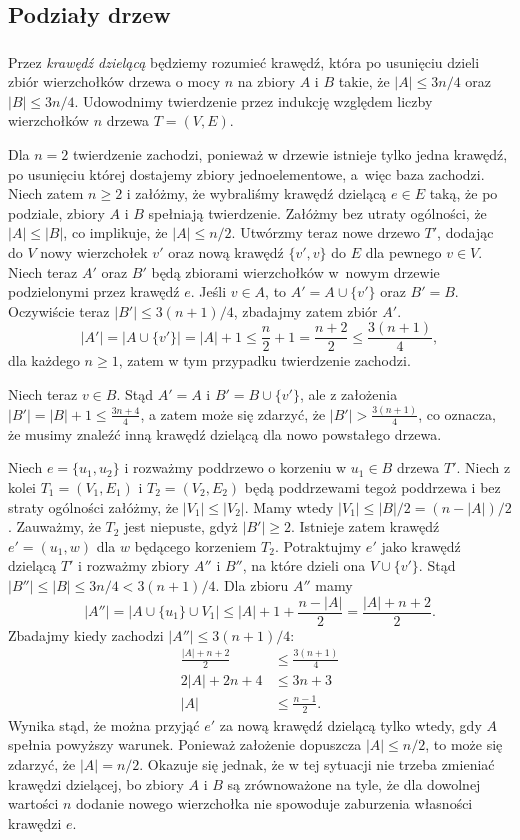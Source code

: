 \subsection{Podziały drzew} %

\subsubsection{} %
Przez \emph{krawędź dzielącą} będziemy rozumieć krawędź, która po usunięciu dzieli zbiór wierzchołków drzewa o mocy $n$ na zbiory $A$ i $B$ takie, że $|A|\le3n/4$ oraz $|B|\le3n/4$. Udowodnimy twierdzenie przez indukcję względem liczby wierzchołków $n$ drzewa $T=(V,E)$.

Dla $n=2$ twierdzenie zachodzi, ponieważ w drzewie istnieje tylko jedna krawędź, po usunięciu której dostajemy zbiory jednoelementowe, a~więc baza zachodzi. Niech zatem $n\ge2$ i załóżmy, że wybraliśmy krawędź dzielącą $e\in E$ taką, że po podziale, zbiory $A$ i $B$ spełniają twierdzenie. Załóżmy bez utraty ogólności, że $|A|\le|B|$, co implikuje, że $|A|\le n/2$. Utwórzmy teraz nowe drzewo $T'$, dodając do $V$ nowy wierzchołek $v'$ oraz nową krawędź $\{v',v\}$ do $E$ dla pewnego $v\in V$. Niech teraz $A'$ oraz $B'$ będą zbiorami wierzchołków w~nowym drzewie podzielonymi przez krawędź $e$. Jeśli $v\in A$, to $A'=A\cup\{v'\}$ oraz $B'=B$. Oczywiście teraz $|B'|\le3(n+1)/4$, zbadajmy zatem zbiór $A'$.
\[
	|A'| = \bigl|A\cup\{v'\}\bigr| = |A|+1 \le \frac{n}{2}+1 = \frac{n+2}{2} \le \frac{3(n+1)}{4},
\]
dla każdego $n\ge1$, zatem w tym przypadku twierdzenie zachodzi.

Niech teraz $v\in B$. Stąd $A'=A$ i $B'=B\cup \{v'\}$, ale z założenia $|B'|=|B|+1\le\frac{3n+4}{4}$, a zatem może się zdarzyć, że $|B'|>\frac{3(n+1)}{4}$, co oznacza, że musimy znaleźć inną krawędź dzielącą dla nowo powstałego drzewa.

Niech $e=\{u_1,u_2\}$ i rozważmy poddrzewo o korzeniu w $u_1\in B$ drzewa $T'$. Niech z kolei $T_1=(V_1,E_1)$ i $T_2=(V_2,E_2)$ będą poddrzewami tegoż poddrzewa i bez straty ogólności załóżmy, że $|V_1|\le|V_2|$. Mamy wtedy $|V_1|\le|B|/2=(n-|A|)/2$. Zauważmy, że $T_2$ jest niepuste, gdyż $|B'|\ge2$. Istnieje zatem krawędź $e'=(u_1,w)$ dla $w$ będącego korzeniem $T_2$. Potraktujmy $e'$ jako krawędź dzielącą $T'$ i rozważmy zbiory $A''$ i $B''$, na które dzieli ona $V\cup\{v'\}$. Stąd $|B''|\le|B|\le3n/4<3(n+1)/4$. Dla zbioru $A''$ mamy
\[
	|A''| = \bigl|A\cup\{u_1\}\cup V_1\bigr| \le |A|+1+\frac{n-|A|}{2} = \frac{|A|+n+2}{2}.
\]
Zbadajmy kiedy zachodzi $|A''|\le3(n+1)/4$:
\begin{align*}
	\frac{|A|+n+2}{2} &\le \frac{3(n+1)}{4} \\
	2|A|+2n+4 &\le 3n+3 \\
	|A| &\le \frac{n-1}{2}.
\end{align*}
Wynika stąd, że można przyjąć $e'$ za nową krawędź dzielącą tylko wtedy, gdy $A$ spełnia powyższy warunek. Ponieważ założenie dopuszcza $|A|\le n/2$, to może się zdarzyć, że $|A|=n/2$. Okazuje się jednak, że w tej sytuacji nie trzeba zmieniać krawędzi dzielącej, bo zbiory $A$ i $B$ są zrównoważone na tyle, że dla dowolnej wartości $n$ dodanie nowego wierzchołka nie spowoduje zaburzenia własności krawędzi $e$.

